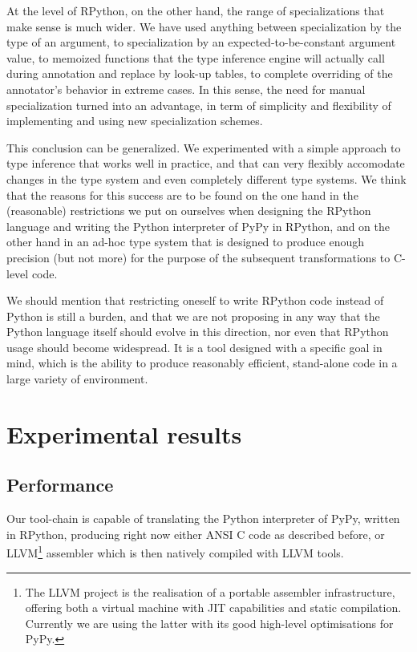 \documentclass{acm_proc_article-sp}
\begin{document}
At the level of RPython, on the other hand, the range of specializations
that make sense is much wider.  We have used anything between
specialization by the type of an argument, to specialization by an
expected-to-be-constant argument value, to memoized functions that the
type inference engine will actually call during annotation and replace
by look-up tables, to complete overriding of the annotator's behavior in
extreme cases.  In this sense, the need for manual specialization turned
into an advantage, in term of simplicity and flexibility of implementing
and using new specialization schemes.

This conclusion can be generalized.  We experimented with a simple
approach to type inference that works well in practice, and that can
very flexibly accomodate changes in the type system and even completely
different type systems.  We think that the reasons for this success are
to be found on the one hand in the (reasonable) restrictions we put on
ourselves when designing the RPython language and writing the Python
interpreter of PyPy in RPython, and on the other hand in an ad-hoc type
system that is designed to produce enough precision (but not more) for
the purpose of the subsequent transformations to C-level code.

We should mention that restricting oneself to write RPython code instead
of Python is still a burden, and that we are not proposing in any way
that the Python language itself should evolve in this direction, nor
even that RPython usage should become widespread.  It is a tool designed
with a specific goal in mind, which is the ability to produce reasonably
efficient, stand-alone code in a large variety of environment.



\section{Experimental results}
\label{experimentalresults}


\subsection{Performance}

Our tool-chain is capable of translating the Python interpreter of
PyPy, written in RPython, producing right now either ANSI C code as
described before, or LLVM\footnote{The LLVM project is the realisation
of a portable assembler infrastructure, offering both a virtual
machine with JIT capabilities and static compilation. Currently we are
using the latter with its good high-level optimisations for PyPy.}
assembler which is then natively compiled with LLVM tools.
\end{document}
